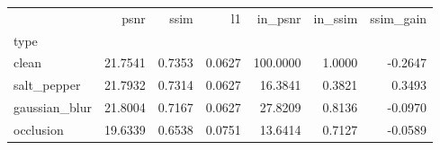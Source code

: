 \begin{tabular}{lrrrrrr}
\toprule
 & psnr & ssim & l1 & in_psnr & in_ssim & ssim_gain \\
type &  &  &  &  &  &  \\
\midrule
clean & 21.7541 & 0.7353 & 0.0627 & 100.0000 & 1.0000 & -0.2647 \\
salt_pepper & 21.7932 & 0.7314 & 0.0627 & 16.3841 & 0.3821 & 0.3493 \\
gaussian_blur & 21.8004 & 0.7167 & 0.0627 & 27.8209 & 0.8136 & -0.0970 \\
occlusion & 19.6339 & 0.6538 & 0.0751 & 13.6414 & 0.7127 & -0.0589 \\
\bottomrule
\end{tabular}
